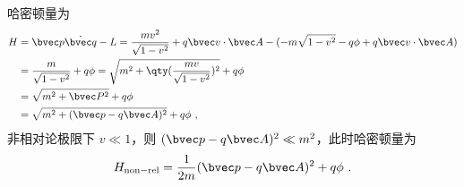 哈密顿量为
\begin{equation}
\begin{aligned}
H&=\bvec p \dot{\bvec q}-L=\frac{mv^2}{\sqrt{1-v^2}}+q\bvec v\cdot \bvec A-(-m\sqrt{1-v^2}-q\phi+q\bvec v\cdot \bvec A)\\
&=\frac{m}{\sqrt{1-v^2}}+q\phi=\sqrt{m^2+\qty(\frac{mv}{\sqrt{1-v^2}})^2}+q\phi\\
&=\sqrt{m^2+\bvec P^2}+q\phi\\
&=\sqrt{m^2+(\bvec p-q\bvec A)^2}+q\phi~,
\end{aligned}
\end{equation}
非相对论极限下 $v\ll 1$，则 $(\bvec p-q\bvec A)^2 \ll m^2$，此时哈密顿量为
\begin{equation}
H_{\rm{non-rel}}=\frac{1}{2m}(\bvec p-q\bvec A)^2+q\phi~.
\end{equation}
